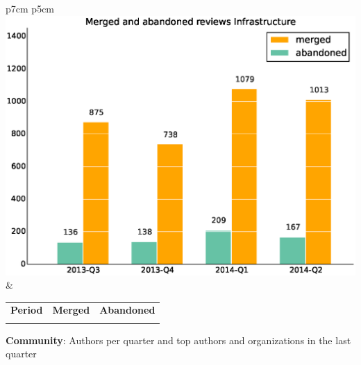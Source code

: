 \documentclass[a4wide,11pt]{report}
\begin{document}
\begin{tabular}{p{7cm} p{5cm}}
    \vspace{0pt} 
    \includegraphics[scale=.35]{figs/submitted_reviewsInfrastructure.eps}
    & 
    \vspace{0pt}
    \begin{tabular}{l|r|r|}%
    \bfseries Period & \bfseries Merged & \bfseries Abandoned %
    \csvreader[head to column names]{data/submitted_reviewsInfrastructure.csv}{}%
    {\\ & \merged & \abandoned}
    \end{tabular}
\end{tabular}

\textbf{Community}: Authors per quarter and top authors and organizations in the last quarter
\end{document}

